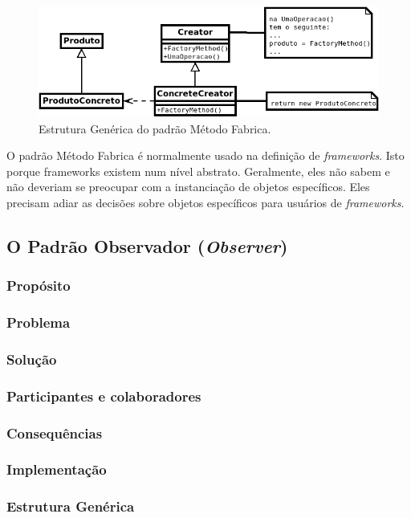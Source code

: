 \documentclass[
	11pt,				%
	openright,
	twoside,			%
	a4paper,			%
	english,			%
	french,
	brazil,				%
	sumario=tradicional
	]{abntex2}
\begin{document}
\begin{figure}[h]
\begin{center}
\includegraphics[scale=0.6]{factoryMethod.png}
\caption{Estrutura Genérica do padrão Método Fabrica.}\label{fig:factMeth}
\end{center}
\end{figure}

O padrão Método Fabrica é normalmente usado na definição de \textit{frameworks}. Isto porque frameworks existem num nível abstrato. Geralmente, eles não sabem e não deveriam se preocupar  com a instanciação de objetos específicos. Eles precisam adiar as decisões sobre objetos específicos para usuários de \textit{frameworks}.

\subsection{O Padrão Observador (\textit{Observer})}
\subsubsection{Propósito}
\subsubsection{Problema}
\subsubsection{Solução}
\subsubsection{Participantes e colaboradores}
\subsubsection{Consequências}
\subsubsection{Implementação}
\subsubsection{Estrutura Genérica}
\end{document}
